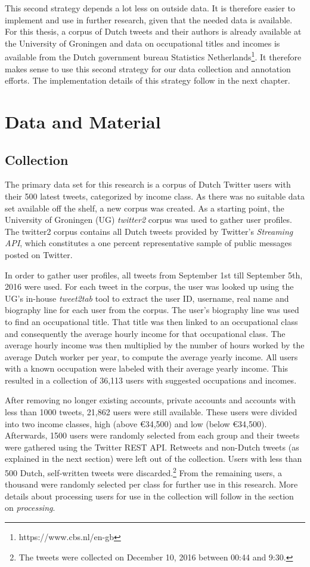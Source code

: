 \documentclass[
10pt, %
a4paper, %
oneside, %
headinclude,footinclude, %
] {book}%
\begin{document}
This second strategy depends a lot less on outside data. It is therefore easier to implement and use in further research, given that the needed data is available.  For this thesis, a corpus of Dutch tweets and their authors is already available at the University of Groningen and data on occupational titles and incomes is available from the Dutch government bureau Statistics Netherlands\footnote{https://www.cbs.nl/en-gb}. It therefore makes sense to use this second strategy for our data collection and annotation efforts. The implementation details of this strategy follow in the next chapter.

\chapter{Data and Material}
\label{datagathering}
\section{Collection} 
The primary data set for this research is a corpus of Dutch Twitter users with their 500 latest tweets, categorized by income class. As there was no suitable data set available off the shelf, a new corpus was created. As a starting point, the University of Groningen (UG) \textit{twitter2} corpus was used to gather user profiles. The twitter2 corpus contains all Dutch tweets provided by Twitter's \textit{Streaming API}, which constitutes a one percent representative sample of public messages posted on Twitter. 

In order to gather user profiles, all tweets from September 1st till September 5th, 2016 were used. For each tweet in the corpus, the user was looked up using the UG's in-house \textit{tweet2tab} tool to extract the user ID, username, real name and biography line for each user from the corpus. The user's biography line was used to find an occupational title. That title was then linked to an occupational class and consequently the average hourly income for that occupational class. The average hourly income was then multiplied by the number of hours worked by the average Dutch worker per year, to compute the average yearly income. All users with a known occupation were labeled with their average yearly income. This resulted in a collection of 36,113 users with suggested occupations and incomes.

After removing no longer existing accounts, private accounts and accounts with less than 1000 tweets, 21,862 users were still available. These users were divided into two income classes, high (above \euro 34,500) and low (below \euro 34,500). Afterwards, 1500 users were randomly selected from each group and their tweets were gathered using the Twitter REST API. Retweets and non-Dutch tweets (as explained in the next section) were left out of the collection. Users with less than 500 Dutch, self-written tweets were discarded.\footnote{The tweets were collected on December 10, 2016 between 00:44 and 9:30.} From the remaining users, a thousand were randomly selected per class for further use in this research. More details about processing users for use in the collection will follow in the section on \textit{processing}.
\end{document}
